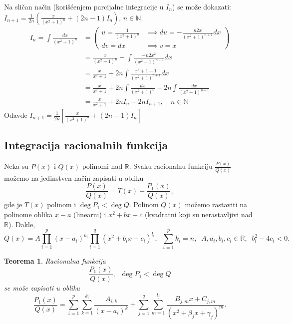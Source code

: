 \documentclass[a4paper,12pt,twoside]{report}
\newtheorem{theorem}{Teorema}[section]
\numberwithin{algorithm}{section}
\begin{document}
\begin{enumerate}[label=\alph*)]
    Na sličan način (korišćenjem parcijalne integracije u \(I_n\)) se može dokazati: \linebreak \(\displaystyle I_{n+1} = \frac{1}{2n} \left( \frac{x}{(x^2+1)^n} + (2n-1)I_n \right)\), \(n \in \mathbb{N}\).
    \begin{align*}
        I_n = \int \frac{dx}{(x^2+1)^n} &= \left( \begin{array}{ll}
            u = \frac{1}{(x^2+1)^n} & \implies du = -\frac{n2x}{(x^2+1)^{n+1}}dx \\[1ex]
            dv = dx & \implies v = x
        \end{array} \right)\\ &= \frac{x}{(x^2+1)^n} - \int \frac{-n2x^2}{(x^2+1)^{n+1}} dx \\
        &= \frac{x}{x^2+1} + 2n \int \frac{x^2+1-1}{(x^2+1)^{n+1}} dx \\  &= \frac{x}{x^2+1} + 2n \int \frac{dx}{(x^2+1)^n} - 2n \int \frac{dx}{(x^2+1)^{n+1}} \\
        &= \frac{x}{x^2+1} + 2n I_n - 2n I_{n+1}, \quad n \in \mathbb{N}
    \end{align*}
    Odavde \quad \(\displaystyle I_{n+1} = \frac{1}{2n} \left[ \frac{x}{(x^2+1)^n} + (2n-1)I_n \right]\)
\end{enumerate}

\subsection{Integracija racionalnih funkcija}

Neka su $P(x)$ i $Q(x)$ polinomi nad $\mathbb{R}$. Svaku racionalnu funkciju $\frac{P(x)}{Q(x)}$ možemo na jedinstven način 
zapisati u obliku \[ \frac{P(x)}{Q(x)} = T(x) + \frac{P_1(x)}{Q(x)}, \] gde je $T(x)$ polinom i $\operatorname{deg}P_1 < \operatorname{deg}Q$.
Polinom $Q(x)$ možemo rastaviti na polinome oblika $x-a$ (linearni) i $x^2 + bx + c$ (kvadratni koji su nerastavljivi nad $\mathbb{R}$).
Dakle, 
\[ Q(x) = A \prod_{i=1}^p (x-a_i)^{k_i} \prod_{i=1}^q (x^2 + b_ix + c_i)^{l_i}, \;\; \sum_{i=1}^{p}k_i = n, \;\; A, a_i, b_i, c_i \in \mathbb{R}, \;\;b_i^2 - 4c_i < 0. \]

\begin{theorem}
    Racionalna funkcija
    \[ \frac{P_1(x)}{Q(x)}, \;\; \operatorname{deg}P_1 < \operatorname{deg} Q \] se može zapisati u obliku
    \[ \frac{P_1(x)}{Q(x)} = \sum_{i=1}^{p} \sum_{k=1}^{k_i} \frac{A_{i,k}}{(x - a_i)^k} + \sum_{j=1}^{q} \sum_{m=1}^{l_j} \frac{B_{j,m} x + C_{j,m}}{(x^2 + \beta_j x + \gamma_j)^m}.  \]
\end{theorem}
\end{document}
